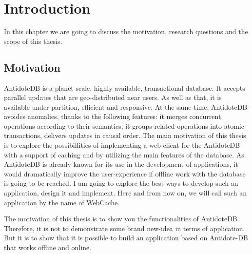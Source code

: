 \chapter{Introduction}
\label{Introduction}

In this chapter we are going to discuss the motivation, research questions and the scope of this thesis.

\section{Motivation}

AntidoteDB is a planet scale, highly available, transactional database. It accepts parallel updates that are geo-distributed near users. As well as that, it is available under partition, efficient and responsive. At the same time, AntidoteDB avoides anomalies, thanks to the following features: it merges concurrent operations according to their semantics, it groups related operations into atomic transactions, delivers updates in causal order. The main motivation of this thesis is to explore the possibillities of implementing a web-client for the AntidoteDB with a support of caching and by utilizing the main features of the database. As AntidoteDB is already known for its use in the development of applications, it would dramatically improve the user-experience if offline work with the database is going to be reached. I am going to explore the best ways to develop such an application, design it and implement. Here and from now on, we will call such an application by the name of WebCache.


The motivation of this thesis is to show you the functionalities of AntidoteDB. Therefore, it is not to demonstrate some brand new-idea in terms of application. But it is to show that it is possible to build an application based on Antidote-DB that works offline and online.


